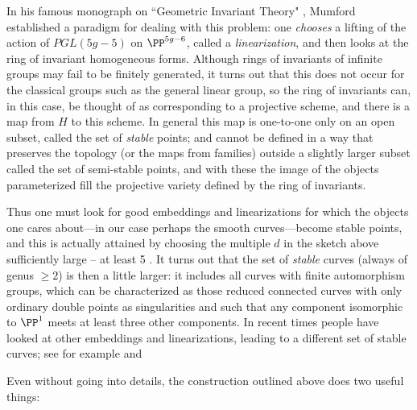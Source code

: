 In his famous monograph on ``Geometric Invariant Theory" \cite{GIT}, Mumford established a paradigm for dealing with this problem: one \emph{chooses} a lifting of the action of $PGL(5g-5)$ on $\PP^{5g-6}$, called a \emph{linearization}, and then looks at the ring of invariant homogeneous forms. Although rings of invariants of infinite groups may fail to be finitely generated, it turns out that this does not occur for the classical groups such as the general linear group, so the ring of invariants can, in this case, be
thought of as corresponding to a projective scheme, and there is a map from $H$
to this scheme. In general this map is one-to-one only on an open subset, called the set of 
\emph{stable} points; and cannot be defined in a way that preserves the topology (or the maps from families) outside a slightly larger subset called the set of 
semi-stable points, and with these the image of the objects parameterized fill the projective variety
defined by the ring of invariants.


Thus one must look for good embeddings and linearizations for which the objects one cares about---in our case perhaps the smooth curves---become stable points, and this is actually attained by choosing the multiple $d$ in the sketch above sufficiently large -- at least 5 . It turns out that the 
set of \emph{stable} curves (always of genus $\geq 2$) is then a little larger: it includes all curves with finite automorphism groups, which can be characterized as those reduced connected curves with only ordinary double points as singularities and such that any component isomorphic to $\PP^1$ meets at least three other components. In recent times people have looked at other embeddings and linearizations, leading to a different set of stable curves; see for example \cite{Schubert} and \cite{Hassett} 


Even without going into details, the construction outlined above does two useful things:

